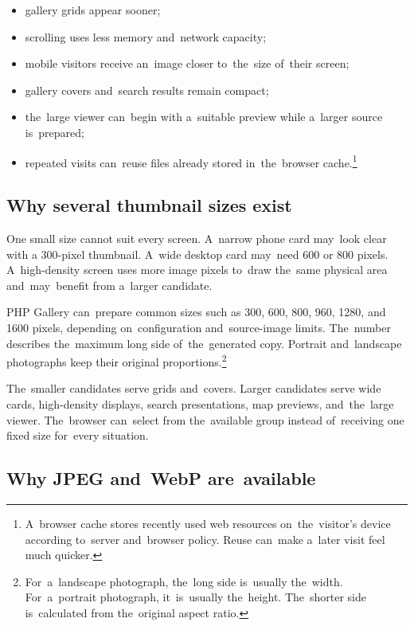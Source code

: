 \documentclass[11pt,a4paper]{article}
\begin{document}
\begin{itemize}
  \item gallery grids appear sooner;
  \item scrolling uses less memory and~network capacity;
  \item mobile visitors receive an~image closer to~the~size of~their screen;
  \item gallery covers and~search results remain compact;
  \item the~large viewer can~begin with a~suitable preview while a~larger source
  is~prepared;
  \item repeated visits can~reuse files already stored in~the~browser
  cache.\footnote{A~browser cache stores recently used web resources
  on~the~visitor's device according to~server and~browser policy. Reuse can~make
  a~later visit feel much quicker.}
\end{itemize}

\subsection{Why several thumbnail sizes exist}

One small size cannot suit every screen. A~narrow phone card may~look clear with
a 300-pixel thumbnail. A~wide desktop card may~need 600 or 800 pixels.
A~high-density screen uses more image pixels to~draw the~same physical area
and~may~benefit from a~larger candidate.

PHP Gallery can~prepare common sizes such as 300, 600, 800, 960, 1280, and 1600
pixels, depending on~configuration and~source-image limits. The~number describes
the~maximum long side of~the~generated copy. Portrait and~landscape photographs
keep their original proportions.\footnote{For~a~landscape photograph, the~long
side is~usually the~width. For~a~portrait photograph, it~is~usually the~height.
The~shorter side is~calculated from the~original aspect ratio.}

The~smaller candidates serve grids and~covers. Larger candidates serve wide
cards, high-density displays, search presentations, map previews, and~the~large
viewer. The~browser can~select from the~available group instead of~receiving one
fixed size for~every situation.

\subsection{Why JPEG and~WebP are~available}
\end{document}
